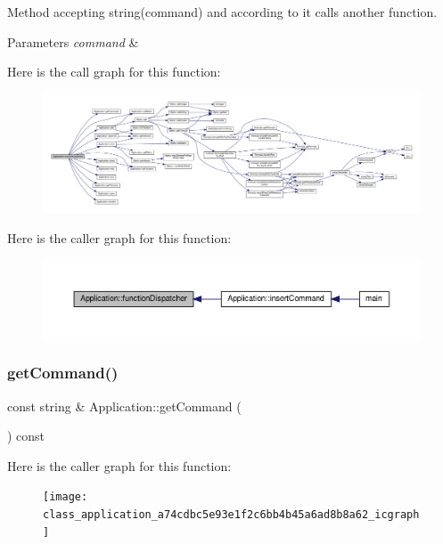 Method accepting string(command) and according to it calls another function. 
\begin{DoxyParams}{Parameters}
{\em command} & \\
\hline
\end{DoxyParams}
Here is the call graph for this function\+:\nopagebreak
\begin{figure}[H]
\begin{center}
\leavevmode
\includegraphics[width=350pt]{class_application_a00241f0a09c32b0ef3cb1f068475cc50_cgraph}
\end{center}
\end{figure}
Here is the caller graph for this function\+:\nopagebreak
\begin{figure}[H]
\begin{center}
\leavevmode
\includegraphics[width=350pt]{class_application_a00241f0a09c32b0ef3cb1f068475cc50_icgraph}
\end{center}
\end{figure}
\mbox{\label{class_application_a74cdbc5e93e1f2c6bb4b45a6ad8b8a62}} 
\subsubsection{\texorpdfstring{get\+Command()}{getCommand()}}
{\footnotesize\ttfamily const string \& Application\+::get\+Command (\begin{DoxyParamCaption}{ }\end{DoxyParamCaption}) const}

Here is the caller graph for this function\+:\nopagebreak
\begin{figure}[H]
\begin{center}
\leavevmode
\texttt{[image: class\_application\_a74cdbc5e93e1f2c6bb4b45a6ad8b8a62\_icgraph]}
\end{center}
\end{figure}
\mbox{\label{class_application_a778575fb76de5352152d8928e1c3410f}} 
